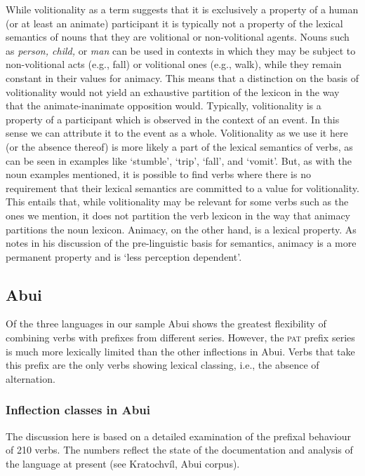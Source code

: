 While volitionality as a term suggests that it is exclusively a property of a human (or at least an animate) participant it is typically not a property of the lexical semantics of nouns that they are volitional or non-volitional agents. Nouns such as \textit{person, child,} or \textit{man} can be used in contexts in which they may be subject to non-volitional acts (e.g., fall) or volitional ones (e.g., walk), while they remain constant in their values for animacy. This means that a distinction on the basis of volitionality would not yield an exhaustive partition of the lexicon in the way that the animate-inanimate opposition would. Typically, volitionality is a property of a participant which is observed in the context of an event. In this sense we can attribute it to the event as a whole. Volitionality as we use it here (or the absence thereof) is more likely a part of the lexical semantics of verbs, as can be seen in examples like `stumble', `trip', `fall', and `vomit'. But, as with the noun examples mentioned, it is possible to find verbs where there is no requirement that their lexical semantics are committed to a value for volitionality. This entails that, while volitionality may be relevant for some verbs such as the ones we mention, it does not partition the verb lexicon in the way that animacy partitions the noun lexicon.   Animacy, on the other hand, is a lexical property. As \citet[43]{Hurford2007} notes in his discussion of the pre-linguistic basis for semantics, animacy is a more permanent property and is `less perception dependent'.

\subsection{Abui} 
\label{sec:10:5.1}
Of the three languages in our sample Abui  shows the greatest flexibility of combining verbs with prefixes from different series. However, the \textsc{pat} prefix series is much more lexically limited than the other inflections  in Abui. Verbs that take this prefix are the only verbs showing lexical classing, i.e., the absence of alternation. 

\subsubsection{   Inflection classes in Abui}  
The discussion here is based on a detailed examination of the prefixal behaviour of 210 verbs. The numbers reflect the state of the documentation and analysis of the language at present (see Kratochv\'il, Abui corpus).

